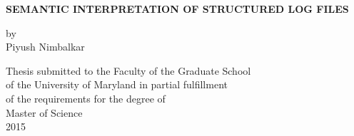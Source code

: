 \begin{titlepage}
\mbox{}\vspace{1in}
\begin{center}

    {\Large \bf SEMANTIC INTERPRETATION OF STRUCTURED LOG FILES \par}
    
\vspace{1.9in}

    {\large by} \\
    {\large Piyush Nimbalkar }
    
\vspace{1.9in}

  \begin{singlespace}
    Thesis submitted to the Faculty of the Graduate School \\
    of the University of Maryland in partial fulfillment \\
    of the requirements for the degree of \\
    Master of Science \\
    2015
	\end{singlespace}
\end{center}
\end{titlepage}
